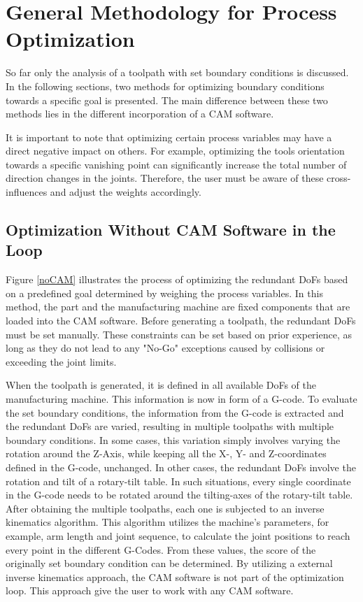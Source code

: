 \documentclass[conference]{IEEEtran}
\begin{document}
\section{General Methodology for Process Optimization}
So far only the analysis of a toolpath with set boundary conditions is discussed. In the following sections, two methods for optimizing boundary conditions towards a specific goal is presented. The main difference between these two methods lies in the different incorporation of a CAM software.

It is important to note that optimizing certain process variables may have a direct negative impact on others. For example, optimizing the tools orientation towards a specific vanishing point can significantly increase the total number of direction changes in the joints. Therefore, the user must be aware of these cross-influences and adjust the weights accordingly.

\subsection{Optimization Without CAM Software in the Loop}\label{noCAMchap}

Figure \ref{noCAM} illustrates the process of optimizing the redundant DoFs based on a predefined goal determined by weighing the process variables. In this method, the part and the manufacturing machine are fixed components that are loaded into the CAM software. Before generating a toolpath, the redundant DoFs must be set manually. These constraints can be set based on prior experience, as long as they do not lead to any "No-Go" exceptions caused by collisions or exceeding the joint limits.

When the toolpath is generated, it is defined in all available DoFs of the manufacturing machine. This information is now in form of a G-code. To evaluate the set boundary conditions, the information from the G-code is extracted and the redundant DoFs are varied, resulting in multiple toolpaths with multiple boundary conditions. In some cases, this variation simply involves varying the rotation around the Z-Axis, while keeping all the X-, Y- and Z-coordinates defined in the G-code, unchanged. In other cases, the redundant DoFs involve the rotation and tilt of a rotary-tilt table. In such situations, every single coordinate in the G-code needs to be rotated around the tilting-axes of the rotary-tilt table. After obtaining the multiple toolpaths, each one is subjected to an inverse kinematics algorithm. This algorithm utilizes the machine's parameters, for example, arm length and joint sequence, to calculate the joint positions to reach every point in the different G-Codes. From these values, the score of the originally set boundary condition can be determined. By utilizing a external inverse kinematics approach, the CAM software is not part of the optimization loop. This approach give  the user to work with any CAM software.  
\end{document}
